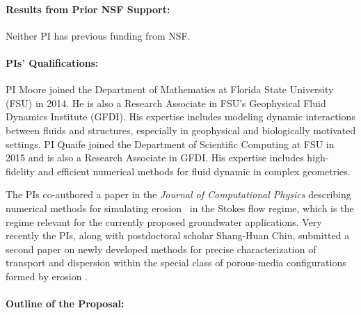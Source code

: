\documentclass[11pt]{article}
\begin{document}
\paragraph{Results from Prior NSF Support:} Neither PI has previous funding from NSF.

\paragraph{PIs' Qualifications:} PI Moore joined the Department of Mathematics at Florida State University (FSU) in 2014. He is also a Research Associate in FSU's Geophysical Fluid Dynamics Institute (GFDI).  His expertise includes modeling dynamic interactions between fluids and structures, especially in geophysical and biologically motivated settings. PI Quaife joined the Department of Scientific Computing at FSU in 2015 and is also a Research Associate in GFDI. His expertise includes high-fidelity and efficient numerical methods for fluid dynamic in complex geometries.

The PIs co-authored a paper in the {\em Journal of Computational Physics} describing numerical methods for simulating erosion~\cite{Quaife2018} in the Stokes flow regime, which is the regime relevant for the currently proposed groundwater applications. Very recently the PIs, along with postdoctoral scholar Shang-Huan Chiu, submitted a second paper on newly developed methods for precise characterization of transport and dispersion within the special class of porous-media configurations formed by erosion \cite{chi-moo-qua2019}.


\paragraph{Outline of the Proposal:} 




\end{document}
